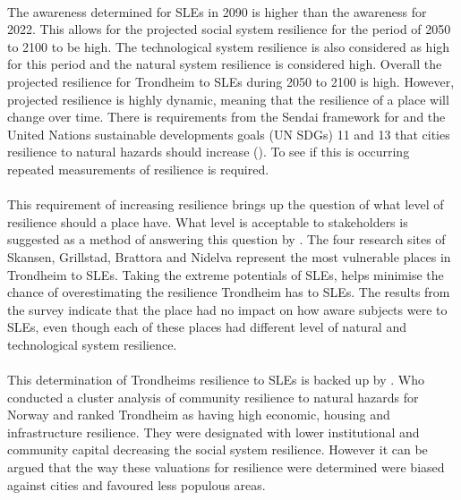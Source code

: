 \paragraph{}
The awareness determined for SLEs in 2090 is higher than the awareness for 2022. This allows for the projected social system resilience for the period of 2050 to 2100 to be high. The technological system resilience is also considered as high for this period and the natural system resilience is considered high. Overall the projected resilience for Trondheim to SLEs during 2050 to 2100 is high. However, projected resilience is highly dynamic, meaning that the resilience of a place will change over time. There is requirements from the Sendai framework for and the United Nations sustainable developments goals (UN SDGs) 11 and 13 that cities resilience to natural hazards should increase (\cite{gonzalez-riancho_storm_2017}). To see if this is occurring repeated measurements of resilience is required. 

\paragraph{}
This requirement of increasing resilience brings up the question of what level of resilience should a place have. What level is acceptable to stakeholders is suggested as a method of answering this question by \cite{gerkensmeier_governing_2018}. The four research sites of Skansen, Grillstad, Brattora and Nidelva represent the most vulnerable places in Trondheim to SLEs. Taking the extreme potentials of SLEs, helps minimise the chance of overestimating the resilience Trondheim has to SLEs. The results from the survey indicate that the place had no impact on how aware subjects were to SLEs, even though each of these places had different level of natural and technological system resilience. 
\paragraph{}
This determination of Trondheims resilience to SLEs is backed up by \cite{opach_seeking_2020}. Who conducted a cluster analysis of community resilience to natural hazards for Norway and ranked Trondheim as having high economic, housing and infrastructure resilience. They were designated with lower institutional and community capital decreasing the social system resilience. However it can be argued that the way these valuations for resilience were determined were biased against cities and favoured less populous areas.



